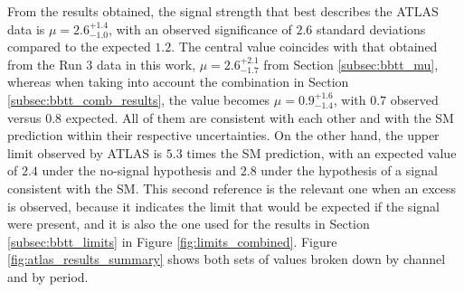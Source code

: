 From the results obtained, the signal strength that best describes the ATLAS data is $\mu = 2.6^{+1.4}_{-1.0}$, with an observed significance of $2.6$ standard deviations compared to the expected $1.2$. The central value coincides with that obtained from the Run 3 data in this work, $\mu = 2.6^{+2.1}_{-1.7}$ from Section \ref{subsec:bbtt_mu}, whereas when taking into account the combination in Section \ref{subsec:bbtt_comb_results}, the value becomes $\mu = 0.9^{+1.6}_{-1.4}$, with $0.7$ observed versus $0.8$ expected. All of them are consistent with each other and with the SM prediction within their respective uncertainties. On the other hand, the upper limit observed by ATLAS is $5.3$ times the SM prediction, with an expected value of $2.4$ under the no-signal hypothesis and $2.8$ under the hypothesis of a signal consistent with the SM. This second reference is the relevant one when an excess is observed, because it indicates the limit that would be expected if the signal were present, and it is also the one used for the results in Section \ref{subsec:bbtt_limits} in Figure \ref{fig:limits_combined}. Figure \ref{fig:atlas_results_summary} shows both sets of values broken down by channel and by period.

